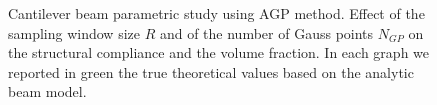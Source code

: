 \begin{figure}
    \quad
    \caption{Cantilever beam parametric study using AGP method. Effect of the sampling window size $R$ and of the number of Gauss points $N_{GP}$ on the structural compliance and the volume fraction. In each graph we reported in green the true theoretical values based on the analytic beam model.}%
    \label{fig:cbGP}%
\end{figure}
